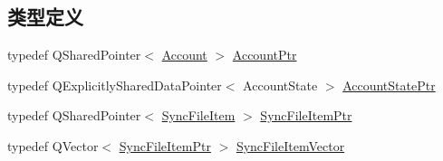 \subsection*{类型定义}
\begin{DoxyCompactItemize}
\item 
typedef Q\+Shared\+Pointer$<$ \hyperlink{class_o_c_c_1_1_account}{Account} $>$ \hyperlink{namespace_o_c_c_a848616aedb9188e223c6b9867757fe69}{Account\+Ptr}
\item 
typedef Q\+Explicitly\+Shared\+Data\+Pointer$<$ Account\+State $>$ \hyperlink{namespace_o_c_c_a6d63fdb73f2bf88258aee6a5e9a0b1f5}{Account\+State\+Ptr}
\item 
typedef Q\+Shared\+Pointer$<$ \hyperlink{class_o_c_c_1_1_sync_file_item}{Sync\+File\+Item} $>$ \hyperlink{namespace_o_c_c_acb6b0db82893659fbd0c98d3c5b8e2b8}{Sync\+File\+Item\+Ptr}
\item 
typedef Q\+Vector$<$ \hyperlink{namespace_o_c_c_acb6b0db82893659fbd0c98d3c5b8e2b8}{Sync\+File\+Item\+Ptr} $>$ \hyperlink{namespace_o_c_c_af407f0fdf0476e0bfce478be3d0e441e}{Sync\+File\+Item\+Vector}
\end{DoxyCompactItemize}

